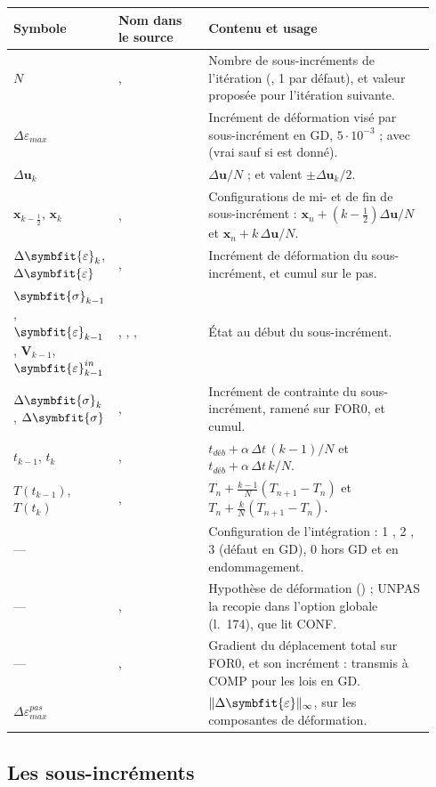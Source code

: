 \documentclass[11pt,a4paper]{article}
\makeatletter
\numberwithin{equation}{section}
\newcommand{\src}[1]{\texttt{\detokenize{#1}}}          %
\newcommand{\op}[1]{\textsf{\small #1}}                 %
\newcommand{\lig}[1]{l.~#1}
\newcommand{\vc}[1]{\symbf{#1}}                         %
\newcommand{\eps}{\varepsilon}
\newcommand{\Deps}{\Delta\symbfit{\varepsilon}}
\newcommand{\sig}{\symbfit{\sigma}}
\newcommand{\vg}[1]{\symbfit{#1}}                       %
\newcommand{\norminf}[1]{\lVert #1\rVert_{\infty}}
\newenvironment{glossaire}[1][Glossaire]{%
  \par\smallskip\needspace{7\baselineskip}\noindent{\sffamily\bfseries\small #1}\par\nopagebreak
  \small
  \renewcommand{\arraystretch}{1.18}
  \begin{longtable}{@{}>{\raggedright\arraybackslash}p{0.17\linewidth}
                     >{\raggedright\arraybackslash}p{0.22\linewidth}
                     >{\raggedright\arraybackslash}p{0.555\linewidth}@{}}
  \toprule
  \textbf{Symbole} & \textbf{Nom dans le source} & \textbf{Contenu et usage}\\
  \midrule\endhead
  \bottomrule\endfoot}
  {\end{longtable}\addtocounter{table}{-1}\normalsize\vspace{-0.4em}}
\makeatother
\begin{document}
\begin{glossaire}
$N$ & \src{nsoincr}, \src{nsoincrn} & Nombre de sous-incréments de l'itération (\src{SOUS_INCREMENT}, 1 par défaut), et valeur proposée pour l'itération suivante.\\
$\Delta\eps_{max}$ & \src{DEPS_MAX} & Incrément de déformation visé par sous-incrément en GD, $5\cdot10^{-3}$ ; avec \src{RECALCUL_SOUSINC} (vrai sauf si \src{SOUS_INCREMENT} est donné).\\
$\Delta\vc u_k$ & \src{ZDEPTI} & $\Delta\vc u/N$ ; \src{ZDEPTI2} et \src{ZDEPTI2n} valent $\pm\Delta\vc u_k/2$.\\
$\vc x_{k-\frac12}$, $\vc x_k$ & \src{GEOMM}, \src{GEOMF} & Configurations de mi- et de fin de sous-incrément : $\vc x_n + (k-\tfrac12)\Delta\vc u/N$ et $\vc x_n + k\,\Delta\vc u/N$.\\
$\Deps_k$, $\Deps$ & \src{DEPSTa}, \src{DEPST} & Incrément de déformation du sous-incrément, et cumul sur le pas.\\
$\sig_{k-1}$, $\vg\eps_{k-1}$, $\vc V_{k-1}$, $\vg\eps^{in}_{k-1}$ & \src{ZSIG0a}, \src{ZDEF0a}, \src{ZVAR0a}, \src{ZDEI0a} & État au début du sous-incrément.\\
$\Delta\sig_k$, $\Delta\sig$ & \src{DSIGTa}, \src{DSIGT} & Incrément de contrainte du sous-incrément, ramené sur FOR0, et cumul.\\
$t_{k-1}$, $t_k$ & \src{tsodeb}, \src{tsofin} & $t_{déb} + \alpha\,\Delta t\,(k-1)/N$ et $t_{déb} + \alpha\,\Delta t\,k/N$.\\
$T(t_{k-1})$, $T(t_k)$ & \src{TETDE}, \src{TETDF} & $T_n + \tfrac{k-1}{N}(T_{n+1} - T_n)$ et $T_n + \tfrac kN(T_{n+1} - T_n)$.\\
— & \src{LAG_TOT} & Configuration de l'intégration : 1 \src{TOTAL}, 2 \src{FIN_PAS}, 3 \src{MI_PAS} (défaut en GD), 0 hors GD et en endommagement.\\
— & \src{HYPDEF}, \src{MEPSIL} & Hypothèse de déformation (\src{HYPOTHESE_DEFORMATIONS}) ; UNPAS la recopie dans l'option globale \src{OPTI 'EPSI'} (\lig{174}), que lit \op{CONF}.\\
— & \src{ZGRDU0}, \src{D_GR_U} & Gradient du déplacement total sur FOR0, et son incrément : transmis à \op{COMP} pour les lois \src{UTILISATEUR} en GD.\\
$\Delta\eps_{max}^{pas}$ & \src{DPSMAX} & $\norminf{\Deps}$, sur les composantes de déformation.\\
\end{glossaire}

\subsection{Les sous-incréments}
\end{document}
